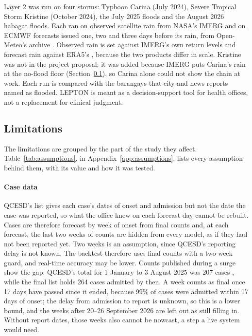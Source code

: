 Layer 2 was run on four storms: Typhoon Carina (July 2024), Severe Tropical Storm Kristine
(October 2024), the July 2025 floods and the August 2026 habagat floods. Each ran on observed
satellite rain from NASA's IMERG \parencite{huffman2024} and on ECMWF forecasts issued one, two
and three days before its rain, from Open-Meteo's archive \parencite{zippenfenig2023}. Observed
rain is set against IMERG's own return levels and forecast rain against ERA5's
\parencite{hersbach2020}, because the two products differ in scale. Kristine was not in the
project proposal; it was added because IMERG puts Carina's rain at the no-flood floor
(Section~\ref{sec:limitations}), so Carina alone could not show the chain at work. Each run is
compared with the barangays that city and news reports named as flooded. LEPTON is meant as a
decision-support tool for health offices, not a replacement for clinical judgment.

\subsection{Limitations}\label{sec:limitations}

The limitations are grouped by the part of the study they affect. Table~\ref{tab:assumptions},
in Appendix~\ref{app:assumptions}, lists every assumption behind them, with its value and how it
was tested.

\paragraph{Case data}
QCESD's list gives each case's dates of onset and admission but not the date the case was
reported, so what the office knew on each forecast day cannot be rebuilt. Cases are therefore
forecast by week of onset from final counts and, at each forecast, the last two weeks of counts
are hidden from every model, as if they had not been reported yet. Two weeks is an assumption,
since QCESD's reporting delay is not known. The backtest therefore uses final counts with a
two-week guard, and real-time accuracy may be lower. Counts published during a surge show the
gap: QCESD's total for 1 January to 3 August 2025 was 207 cases \parencite{herriman2025}, while
the final list holds 264 cases admitted by then. A week counts as final once 17 days have
passed since it ended, because 99\% of cases were admitted within 17 days of onset; the delay
from admission to report is unknown, so this is a lower bound, and the weeks after 20--26
September 2026 are left out as still filling in. Without report dates, those weeks also cannot
be nowcast, a step a live system would need.

